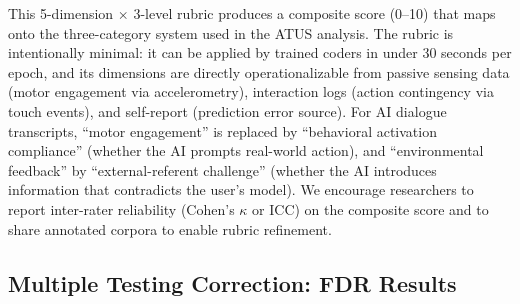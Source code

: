 \documentclass[a4paper,11pt,titlepage]{article}
\begin{document}
This 5-dimension $\times$ 3-level rubric produces a composite score (0--10) that maps onto the three-category system used in the ATUS analysis. The rubric is intentionally minimal: it can be applied by trained coders in under 30 seconds per epoch, and its dimensions are directly operationalizable from passive sensing data (motor engagement via accelerometry), interaction logs (action contingency via touch events), and self-report (prediction error source). For AI dialogue transcripts, ``motor engagement'' is replaced by ``behavioral activation compliance'' (whether the AI prompts real-world action), and ``environmental feedback'' by ``external-referent challenge'' (whether the AI introduces information that contradicts the user's model). We encourage researchers to report inter-rater reliability (Cohen's $\kappa$ or ICC) on the composite score and to share annotated corpora to enable rubric refinement.


\subsection{Multiple Testing Correction: FDR Results}\label{app:fdr}
\end{document}
